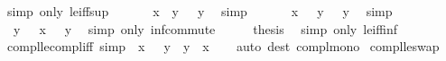 \begin{isabellebody}
\ {\isacharparenleft}{\kern0pt}simp\ only{\isacharcolon}{\kern0pt}\ le{\isacharunderscore}{\kern0pt}iff{\isacharunderscore}{\kern0pt}sup{\isacharparenright}{\kern0pt}\isanewline
\ \ \isamarkupfalse%
\ \isamarkupfalse%
\ {\isachardoublequoteopen}{\isacharminus}{\kern0pt}\ {\isacharparenleft}{\kern0pt}x\ {\isasymsqunion}\ y{\isacharparenright}{\kern0pt}\ {\isacharequal}{\kern0pt}\ {\isacharminus}{\kern0pt}\ y{\isachardoublequoteclose}\ \isamarkupfalse%
\ simp\isanewline
\ \ \isamarkupfalse%
\ \isamarkupfalse%
\ {\isachardoublequoteopen}{\isacharminus}{\kern0pt}\ x\ {\isasymsqinter}\ {\isacharminus}{\kern0pt}\ y\ {\isacharequal}{\kern0pt}\ {\isacharminus}{\kern0pt}\ y{\isachardoublequoteclose}\ \isamarkupfalse%
\ simp\isanewline
\ \ \isamarkupfalse%
\ \isamarkupfalse%
\ {\isachardoublequoteopen}{\isacharminus}{\kern0pt}\ y\ {\isasymsqinter}\ {\isacharminus}{\kern0pt}\ x\ {\isacharequal}{\kern0pt}\ {\isacharminus}{\kern0pt}\ y{\isachardoublequoteclose}\ \isamarkupfalse%
\ {\isacharparenleft}{\kern0pt}simp\ only{\isacharcolon}{\kern0pt}\ inf{\isacharunderscore}{\kern0pt}commute{\isacharparenright}{\kern0pt}\isanewline
\ \ \isamarkupfalse%
\ \isamarkupfalse%
\ {\isacharquery}{\kern0pt}thesis\ \isamarkupfalse%
\ {\isacharparenleft}{\kern0pt}simp\ only{\isacharcolon}{\kern0pt}\ le{\isacharunderscore}{\kern0pt}iff{\isacharunderscore}{\kern0pt}inf{\isacharparenright}{\kern0pt}\isanewline
{}\isamarkupfalse%
%
\endisatagproof
{\isafoldproof}%
%
\isadelimproof
\isanewline
%
\endisadelimproof
\isanewline
{}\isamarkupfalse%
\ compl{\isacharunderscore}{\kern0pt}le{\isacharunderscore}{\kern0pt}compl{\isacharunderscore}{\kern0pt}iff\ {\isacharbrackleft}{\kern0pt}simp{\isacharbrackright}{\kern0pt}{\isacharcolon}{\kern0pt}\ {\isachardoublequoteopen}{\isacharminus}{\kern0pt}\ x\ {\isasymle}\ {\isacharminus}{\kern0pt}\ y\ {\isasymlongleftrightarrow}\ y\ {\isasymle}\ x{\isachardoublequoteclose}\isanewline
%
\isadelimproof
\ \ %
\endisadelimproof
%
\isatagproof
{}\isamarkupfalse%
\ {\isacharparenleft}{\kern0pt}auto\ dest{\isacharcolon}{\kern0pt}\ compl{\isacharunderscore}{\kern0pt}mono{\isacharparenright}{\kern0pt}%
\endisatagproof
{\isafoldproof}%
%
\isadelimproof
\isanewline
%
\endisadelimproof
\isanewline
{}\isamarkupfalse%
\ compl{\isacharunderscore}{\kern0pt}le{\isacharunderscore}{\kern0pt}swap{}{\isacharcolon}{\kern0pt}\isanewline

\end{isabellebody}
